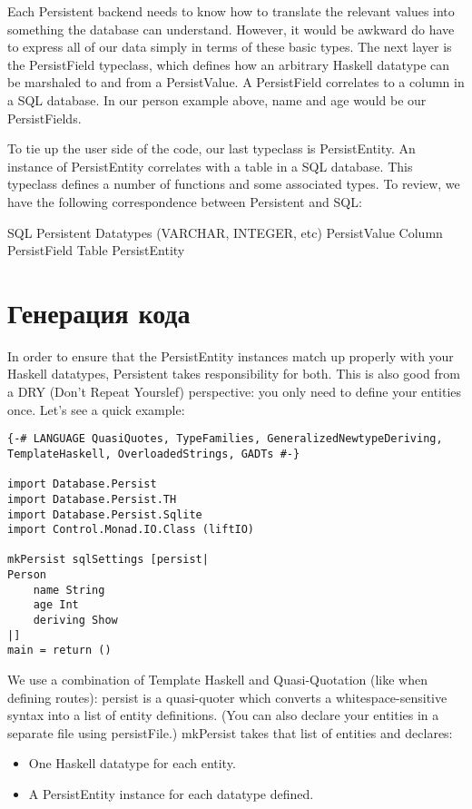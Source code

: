Each Persistent backend needs to know how to translate the relevant values into something the database can understand. However, it would be awkward do have to express all of our data simply in terms of these basic types. The next layer is the PersistField typeclass, which defines how an arbitrary Haskell datatype can be marshaled to and from a PersistValue. A PersistField correlates to a column in a SQL database. In our person example above, name and age would be our PersistFields.

To tie up the user side of the code, our last typeclass is PersistEntity. An instance of PersistEntity correlates with a table in a SQL database. This typeclass defines a number of functions and some associated types. To review, we have the following correspondence between Persistent and SQL:


SQL	Persistent
Datatypes (VARCHAR, INTEGER, etc)	PersistValue
Column	PersistField
Table	PersistEntity

\section{Генерация кода} %

In order to ensure that the PersistEntity instances match up properly with your Haskell datatypes, Persistent takes responsibility for both. This is also good from a DRY (Don't Repeat Yourslef) perspective: you only need to define your entities once. Let's see a quick example:

\begin{lstlisting}
{-# LANGUAGE QuasiQuotes, TypeFamilies, GeneralizedNewtypeDeriving, TemplateHaskell, OverloadedStrings, GADTs #-}

import Database.Persist
import Database.Persist.TH
import Database.Persist.Sqlite
import Control.Monad.IO.Class (liftIO)

mkPersist sqlSettings [persist|
Person
    name String
    age Int
    deriving Show
|]
main = return ()
\end{lstlisting}

We use a combination of Template Haskell and Quasi-Quotation (like when defining routes): persist is a quasi-quoter which converts a whitespace-sensitive syntax into a list of entity definitions. (You can also declare your entities in a separate file using persistFile.) mkPersist takes that list of entities and declares:

\begin{itemize}
  \item One Haskell datatype for each entity.
  \item A PersistEntity instance for each datatype defined.
\end{itemize}

